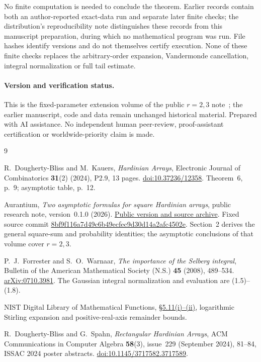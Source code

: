\documentclass[11pt]{article}
\theoremstyle{remark}
\begin{document}
No finite computation is needed to conclude the theorem. Earlier records
contain both an author-reported exact-data run and separate later finite
checks; the distribution's reproducibility note distinguishes these records
from this manuscript preparation, during which no mathematical program was
run. File hashes identify versions and do not themselves certify execution.
None of these finite checks replaces the arbitrary-order expansion,
Vandermonde cancellation, integral normalization or full tail estimate.

\paragraph{Version and verification status.}
This is the fixed-parameter extension volume of the public $r=2,3$
note~\cite{prior}; the earlier manuscript, code and data remain unchanged
historical material. Prepared with AI assistance. No independent human
peer-review, proof-assistant certification or worldwide-priority claim is
made.

\begin{thebibliography}{9}
\raggedright
{}
R.~Dougherty-Bliss and M.~Kauers,
\emph{Hardinian Arrays}, Electronic Journal of Combinatorics
\textbf{31}(2) (2024), P2.9, 13 pages.
\href{https://doi.org/10.37236/12358}{doi:10.37236/12358}.
Theorem~6, p.~9; asymptotic table, p.~12.

Aurantium, \emph{Two asymptotic formulas for square Hardinian arrays},
public research note, version~0.1.0 (2026).
\href{https://github.com/Aurantium-47/hardinian-array-asymptotics/releases/tag/v0.1.0}{Public version and source archive}.
Fixed source commit
\href{https://github.com/Aurantium-47/hardinian-array-asymptotics/blob/8bf9f116a7d49c6b49ecfec9d30d14a2afc4502e/main.tex}{8bf9f116a7d49c6b49ecfec9d30d14a2afc4502e}.
Section~2 derives the general square-sum and probability identities; the
asymptotic conclusions of that volume cover $r=2,3$.

P.~J.~Forrester and S.~O.~Warnaar,
\emph{The importance of the Selberg integral}, Bulletin of the American
Mathematical Society (N.S.) \textbf{45} (2008), 489--534.
\href{https://arxiv.org/abs/0710.3981}{arXiv:0710.3981}.
The Gaussian integral normalization and evaluation are (1.5)--(1.8).

NIST Digital Library of Mathematical Functions,
\href{https://dlmf.nist.gov/5.11}{\S5.11(i)--(ii)},
logarithmic Stirling expansion and positive-real-axis remainder bounds.

R.~Dougherty-Bliss and G.~Spahn,
\emph{Rectangular Hardinian Arrays}, ACM Communications in Computer Algebra
\textbf{58}(3), issue~229 (September 2024), 81--84,
ISSAC 2024 poster abstracts.
\href{https://doi.org/10.1145/3717582.3717589}{doi:10.1145/3717582.3717589}.
\end{thebibliography}
\end{document}

